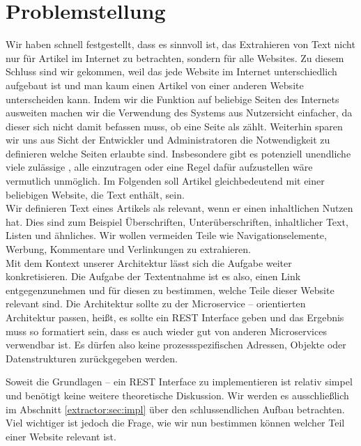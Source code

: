 \section{Problemstellung}
Wir haben schnell festgestellt, dass es sinnvoll ist, das Extrahieren von Text nicht nur für Artikel im Internet zu betrachten, sondern für alle Websites. Zu diesem Schluss sind wir gekommen, weil das jede Website im Internet unterschiedlich aufgebaut ist und man kaum einen Artikel von einer anderen Website unterscheiden kann. Indem wir die Funktion auf beliebige Seiten des Internets ausweiten machen wir die Verwendung des Systems aus Nutzersicht einfacher, da dieser sich nicht damit befassen muss, ob eine Seite als  zählt. Weiterhin sparen wir uns aus Sicht der Entwickler und Administratoren die Notwendigkeit zu definieren welche Seiten erlaubte  sind. Insbesondere gibt es potenziell unendliche viele zulässige , alle einzutragen oder eine Regel dafür aufzustellen wäre vermutlich unmöglich.
Im Folgenden soll Artikel gleichbedeutend mit einer beliebigen Website, die Text enthält, sein.\\
Wir definieren Text eines Artikels als relevant, wenn er einen inhaltlichen Nutzen hat. Dies sind zum Beispiel Überschriften, Unterüberschriften, inhaltlicher Text, Listen und ähnliches. Wir wollen vermeiden Teile wie Navigationselemente, Werbung, Kommentare und Verlinkungen zu extrahieren. \\
Mit dem Kontext unserer Architektur lässt sich die Aufgabe weiter konkretisieren. Die Aufgabe der Textentnahme ist es also, einen Link entgegenzunehmen und für diesen zu bestimmen, welche Teile dieser Website relevant sind. Die Architektur sollte zu der Microservice – orientierten Architektur passen, heißt, es sollte ein REST Interface geben und das Ergebnis muss so formatiert sein, dass es auch wieder gut von anderen Microservices verwendbar ist. Es dürfen also keine prozessspezifischen Adressen, Objekte oder Datenstrukturen zurückgegeben werden. \\ \par
Soweit die Grundlagen – ein REST Interface zu implementieren ist relativ simpel und benötigt keine weitere theoretische Diskussion. Wir werden es ausschließlich im Abschnitt \ref{extractor:sec:impl} über den schlussendlichen Aufbau betrachten. Viel wichtiger ist jedoch die Frage, wie wir nun bestimmen können welcher Teil einer Website relevant ist. 

